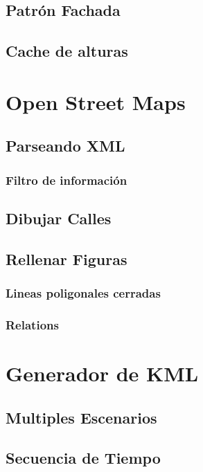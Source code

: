 \subsection*{Patrón Fachada}
\subsection*{Cache de alturas}
\section*{Open Street Maps}
\subsection*{Parseando XML}
\subsubsection*{Filtro de información}
\subsection*{Dibujar Calles}
\subsection*{Rellenar Figuras}
\subsubsection*{Lineas poligonales cerradas}
\subsubsection*{Relations}
\section*{Generador de KML}
\subsection*{Multiples Escenarios}
\subsection*{Secuencia de Tiempo}
